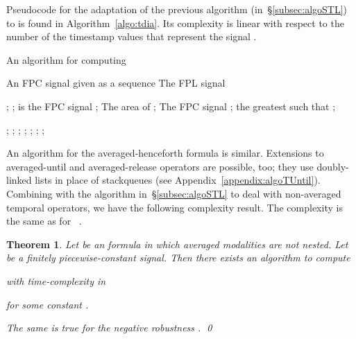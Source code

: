 \documentclass[envcountsect,orivec]{llncs} \usepackage{etex} \usepackage[]{graphicx}
\newtheorem{mytheorem}{Theorem}[section]
\def\myqed{\qed}
\begin{document}
Pseudocode for the adaptation of the previous algorithm 
(in~\S{}\ref{subsec:algoSTL}) to
 is found in
Algorithm~\ref{algo:tdia}.
Its complexity is linear  with respect to the number  of the timestamp
values that represent the  signal .


\begin{algorithm}[tbp]
  \caption{An algorithm for computing }
  \label{algo:tdia}
  \begin{algorithmic}
    \Require An FPC signal 
    given as a sequence  
\Ensure The FPL signal

    \State ;
    \State ; 
    \Comment  is the FPC signal 
\State ;
    \Comment The area of 
    \State ; 
    \Comment The FPC signal 
    \While{}
    \State ;
    \State  the greatest  such that 
    ;

    \State ; \quad ;
\State ; \quad ;
    \State ; 
    \State  
    \State ;
    \State ;
    \State 
\State 
\EndWhile
  \end{algorithmic}
\end{algorithm}













An algorithm for the averaged-henceforth formula
 is similar. Extensions to
averaged-until and averaged-release operators are possible, too; they
use doubly-linked lists in place of stackqueues (see Appendix~\ref{appendix:algoTUntil}).
Combining with the algorithm in~\S{}\ref{subsec:algoSTL} to deal with
non-averaged temporal operators, we have the following 
complexity result. The complexity is the same as for ~\cite{DBLP:conf/cav/DonzeFM13}.







\begin{mytheorem}\label{thm:complexity_rel}
  Let  be an  formula 
  in which averaged modalities are not nested.
  Let  be a finitely piecewise-constant signal.
Then there exists an algorithm
  to compute
  
  with time-complexity in 
  
  for some constant .

  The same is true for the negative robustness
  .
  \myqed
\end{mytheorem}
\end{document}
